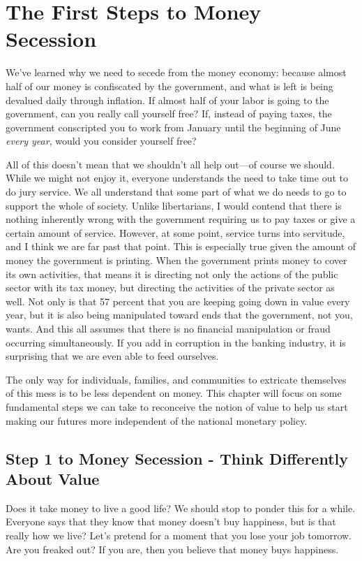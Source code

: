\chapter{The First Steps to Money Secession}

We’ve learned why we need to secede from the money economy:
because almost half
of our money is confiscated by the government, and what is left is
being devalued daily through inflation. If almost half of your labor is
going to the government, can you really call yourself free?  If,
instead of paying taxes, the government conscripted you to work from
January until the beginning of June \textit{every year}, would you
consider yourself free?

All of this doesn’t
mean that we shouldn’t all help out—of course we should. While we might
not enjoy it, everyone understands the need to take time out to do jury
service. We all understand that some part of what we do needs to go to
support the whole of society. Unlike libertarians, I would contend that
there is nothing inherently wrong with the government requiring us to
pay taxes or give a certain amount of service. However, at some point,
service turns into servitude, and I think we are far past that point.
This is especially true given the amount of money the government is
printing. When the government prints money to cover its own activities,
that means it is directing not only the actions of the public sector
with its tax money, but directing the activities of the private sector
as well. Not only is that 57 percent that you are keeping going down in
value every year, but it is also being manipulated toward ends that the
government, not you, wants.  And this all assumes that there is no
financial manipulation or fraud occurring simultaneously.  If you add
in corruption in the banking industry, it is surprising that we are
even able to feed ourselves.

The only way for individuals, families, and communities to extricate
themselves of this mess is to be less dependent on money. This chapter
will focus on some fundamental steps we can take to reconceive the
notion of value to help us start making our futures more independent of
the national monetary policy.

\section{Step 1 to Money Secession - Think Differently About Value}

Does it take money to live a good life?  We should stop to ponder this
for a while. Everyone says that they know that money doesn’t buy
happiness, but is that really how we live? Let’s pretend for a moment
that you lose your job tomorrow. Are you freaked out?  If you are, then
you believe that money buys happiness. 

